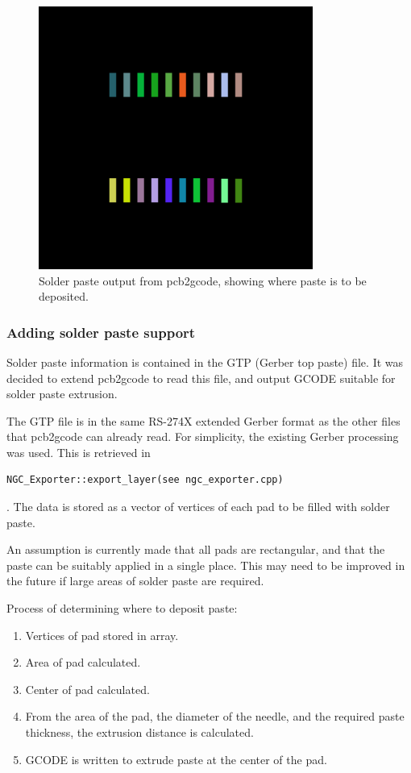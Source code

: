 \begin{figure}[ht!]
\centering
\includegraphics[width=90mm]{resources/breakout_paste.png}
\caption{Solder paste output from pcb2gcode, showing where paste is to be deposited.}
\label{pcb2gcodepaste}
\end{figure}

\subsubsection{Adding solder paste support}
Solder paste information is contained in the GTP (Gerber top paste) file. It was decided to extend pcb2gcode to read this file, and output GCODE suitable for solder paste extrusion.

The GTP file is in the same RS-274X extended Gerber format as the other files that pcb2gcode can already read. For simplicity, the existing Gerber processing was used.
This is retrieved in \begin{verbatim}NGC_Exporter::export_layer(see ngc_exporter.cpp)\end{verbatim}. The data is stored as a vector of vertices of each pad to be filled with solder paste.

An assumption is currently made that all pads are rectangular, and that the paste can be suitably applied in a single place. This may need to be improved in the future if large areas
of solder paste are required.

Process of determining where to deposit paste:

\begin{enumerate}
	\item	Vertices of pad stored in array.
	\item	Area of pad calculated.
	\item	Center of pad calculated.
	\item	From the area of the pad, the diameter of the needle, and the required paste thickness, the extrusion distance is calculated.
	\item	GCODE is written to extrude paste at the center of the pad.
\end{enumerate}

